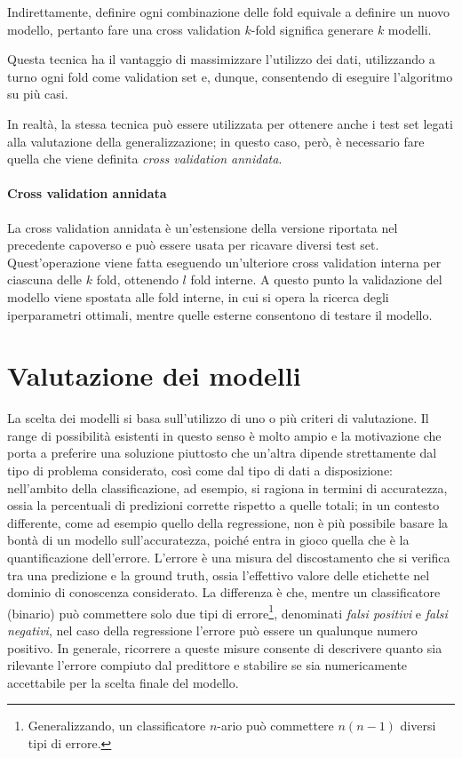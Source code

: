\documentclass[12pt]{report}
\theoremstyle{definition}
\begin{document}
Indirettamente, definire ogni combinazione delle fold equivale a definire un nuovo modello, pertanto fare una cross validation $k$-fold significa generare $k$ modelli.

Questa tecnica ha il vantaggio di massimizzare l'utilizzo dei dati, utilizzando a turno ogni fold come validation set e, dunque, consentendo di eseguire l'algoritmo su più casi.

In realtà, la stessa tecnica può essere utilizzata per ottenere anche i test set legati alla valutazione della generalizzazione; in questo caso, però, è necessario fare quella che viene definita \textit{cross validation annidata}.

\paragraph{Cross validation annidata}
La cross validation annidata è un'estensione della versione riportata nel precedente capoverso e può essere usata per ricavare diversi test set. Quest'operazione viene fatta eseguendo un'ulteriore cross validation interna per ciascuna delle $k$ fold, ottenendo $l$ fold interne. A questo punto la validazione del modello viene spostata alle fold interne, in cui si opera la ricerca degli iperparametri ottimali, mentre quelle esterne consentono di testare il modello.

\section{Valutazione dei modelli}\label{evaluation}
La scelta dei modelli si basa sull'utilizzo di uno o più criteri di valutazione. Il range di possibilità esistenti in questo senso è molto ampio e la motivazione che porta a preferire una soluzione piuttosto che un'altra dipende strettamente dal tipo di problema considerato, così come dal tipo di dati a disposizione: nell'ambito della classificazione, ad esempio, si ragiona in termini di accuratezza, ossia la percentuali di predizioni corrette rispetto a quelle totali; in un contesto differente, come ad esempio quello della regressione, non è più possibile basare la bontà di un modello sull'accuratezza, poiché entra in gioco quella che è la quantificazione dell'errore. L'errore è una misura del discostamento che si verifica tra una predizione e la ground truth, ossia l'effettivo valore delle etichette nel dominio di conoscenza considerato.
La differenza è che, mentre un classificatore (binario) può commettere solo due tipi di errore\footnote{Generalizzando, un classificatore $n$-ario può commettere $n(n-1)$ diversi tipi di errore.}, denominati \textit{falsi positivi} e \textit{falsi negativi}, nel caso della regressione l'errore può essere un qualunque numero positivo.
In generale, ricorrere a queste misure consente di descrivere quanto sia rilevante l'errore compiuto dal predittore e stabilire se sia numericamente accettabile per la scelta finale del modello.
\end{document}
